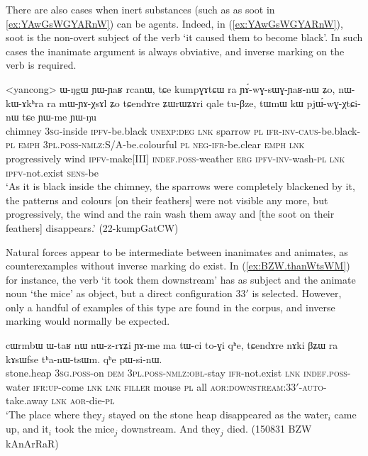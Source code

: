 There are also cases when inert substances (such as as soot in \ref{ex:YAwGsWGYARnW}) can be agents. Indeed, in (\ref{ex:YAwGsWGYARnW}), soot is the non-overt subject of the verb   `it caused them to become black'. In such cases the inanimate argument is always obviative, and inverse marking on the verb is required.

\begin{exe}
\ex \label{ex:YAwGsWGYARnW} 
\gll <yancong> ɯ-ŋgɯ ɲɯ-ɲaʁ rcanɯ, tɕe kumpɣɤtɕɯ ra ɲɤ́-wɣ-sɯɣ-ɲaʁ-nɯ ʑo, nɯ-kɯ-ɤkʰra ra mɯ-ɲɤ-χsɤl ʑo tɕendɤre ʑɯrɯʑɤri qale tu-βze, tɯmɯ kɯ pjɯ́-wɣ-χtɕi-nɯ tɕe ɲɯ-me ɲɯ-ŋu \\
chimney \textsc{3sg}-inside \textsc{ipfv}-be.black \textsc{unexp}:\textsc{deg} \textsc{lnk} sparrow \textsc{pl} \textsc{ifr}-\textsc{inv}-\textsc{caus}-be.black-\textsc{pl} \textsc{emph} \textsc{3pl}.\textsc{poss}-\textsc{nmlz}:S/A-be.colourful \textsc{pl} \textsc{neg}-\textsc{ifr}-be.clear \textsc{emph} \textsc{lnk} progressively wind \textsc{ipfv}-make[III] \textsc{indef}.\textsc{poss}-weather \textsc{erg} \textsc{ipfv}-\textsc{inv}-wash-\textsc{pl} \textsc{lnk} \textsc{ipfv}-not.exist \textsc{sens}-be \\
\glt `As it is black inside the chimney, the sparrows were completely blackened by it, the patterns and colours [on their feathers] were not visible any more, but progressively, the wind and the rain wash them away and [the soot on their feathers] disappears.' (22-kumpGatCW) 
 
\end{exe}

Natural forces appear to be intermediate between inanimates and animates, as counterexamples without inverse marking do exist. In (\ref{ex:BZW.thanWtsWM}) for instance, the verb  `it took them downstream' has  as subject and the animate noun  `the mice' as object, but a direct configuration 3\fl{}3$'$ is selected. However, only a handful of examples of this type are found in the corpus, and inverse marking would normally be expected.

\begin{exe}
\ex \label{ex:BZW.thanWtsWM}
\gll cɯrmbɯ ɯ-taʁ nɯ nɯ-z-rɤʑi ɲɤ-me ma tɯ-ci to-ɣi qʰe, tɕendɤre nɤki βʑɯ ra kɤsɯfse tʰa-nɯ-tsɯm. qʰe pɯ-si-nɯ. \\
stone.heap \textsc{3sg}.\textsc{poss}-on \textsc{dem} \textsc{3pl}.\textsc{poss}-\textsc{nmlz}:\textsc{obl}-stay \textsc{ifr}-not.exist \textsc{lnk} \textsc{indef}.\textsc{poss}-water \textsc{ifr}:\textsc{up}-come \textsc{lnk} \textsc{lnk} \textsc{filler} mouse \textsc{pl} all \textsc{aor}:\textsc{downstream}:3\fl{}3$'$-\textsc{auto}-take.away \textsc{lnk} \textsc{aor}-die-\textsc{pl} \\
\glt `The place where they$_j$ stayed on the stone heap disappeared as the water$_i$ came up, and it$_i$ took the mice$_j$ downstream. And they$_j$ died.  (150831 BZW kAnArRaR)
\end{exe}

